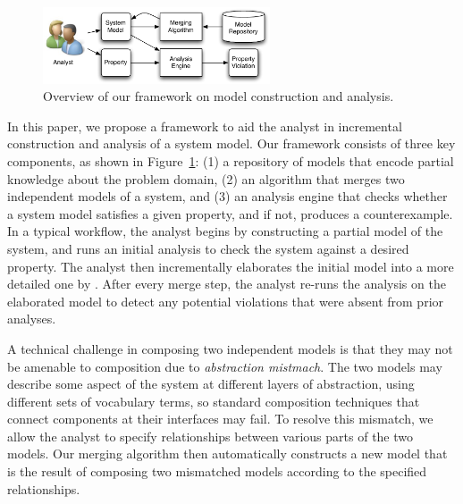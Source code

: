 \begin{figure}[!t]
\centering
\includegraphics[width=0.60\textwidth]{diagrams/overview}
\caption{Overview of our framework on model construction and analysis.}
\label{fig-overview}
\end{figure}

In this paper, we propose a framework to aid the analyst in
incremental construction and analysis of a system model. Our framework
consists of three key components, as shown in
Figure~\ref{fig-overview}: (1) a repository of models that encode
partial knowledge about the problem domain, (2) an algorithm that
merges two independent models of a system, and (3) an analysis engine
that checks whether a system model satisfies a given property, and if
not, produces a counterexample. In a typical workflow, the analyst
begins by constructing a partial model of the system, and runs an
initial analysis to check the system against a desired property. The
analyst then incrementally elaborates the initial model into a more
detailed one by . After every merge step, the analyst re-runs the
analysis on the elaborated model to detect any potential violations
that were absent from prior analyses.

A technical challenge in composing two independent models is that they
may not be amenable to composition due to \textit{abstraction
  mistmach}. The two models may describe some aspect of the system
at different layers of abstraction, using different sets of vocabulary
terms, so standard composition techniques that connect components at
their interfaces may fail. To resolve this mismatch, we allow the
analyst to specify relationships between various parts of the two
models. Our merging algorithm then automatically constructs a new
model that is the result of composing two mismatched models according
to the specified relationships.

